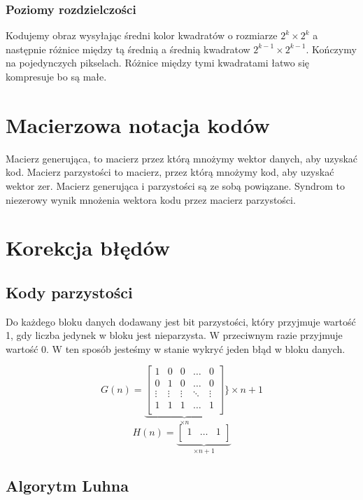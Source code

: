 \documentclass{../notatki}
\begin{document}
\subsubsection{Poziomy rozdzielczości}

Kodujemy obraz wysyłając średni kolor kwadratów o rozmiarze $2^k \times 2^k$
a następnie różnice między tą średnią a średnią kwadratow $2^{k-1}
\times 2^{k-1}$. Kończymy na pojedynczych pikselach. Różnice między tymi
kwadratami łatwo się kompresuje bo są małe.

\section{Macierzowa notacja kodów}

Macierz generująca, to macierz przez którą mnożymy wektor danych, aby uzyskać
kod. Macierz parzystości to macierz, przez którą mnożymy kod, aby uzyskać
wektor zer. Macierz generująca i parzystości są ze sobą powiązane.
Syndrom to niezerowy wynik mnożenia wektora kodu przez macierz parzystości.

\section{Korekcja błędów}

\subsection{Kody parzystości}

Do każdego bloku danych dodawany jest bit parzystości, który przyjmuje wartość
1, gdy liczba jedynek w bloku jest nieparzysta. W przeciwnym razie
przyjmuje wartość 0. W ten sposób jesteśmy w stanie wykryć jeden błąd w bloku
danych.

$$
G(n) =
\underbrace{
  \begin{bmatrix}
    1 & 0 & 0 & \dots & 0 \\
    0 & 1 & 0 & \dots & 0 \\
    \vdots & \vdots & \vdots & \ddots & \vdots \\
    1 & 1 & 1 & \dots & 1 \\
  \end{bmatrix}
}_{\times n}
\Bigg \rbrace \times n + 1
$$
$$
H(n) = \underbrace{
  \begin{bmatrix}
    1 & \dots & 1 \\
  \end{bmatrix}
}_{\times n + 1}
$$

\subsection{Algorytm Luhna}
\end{document}
